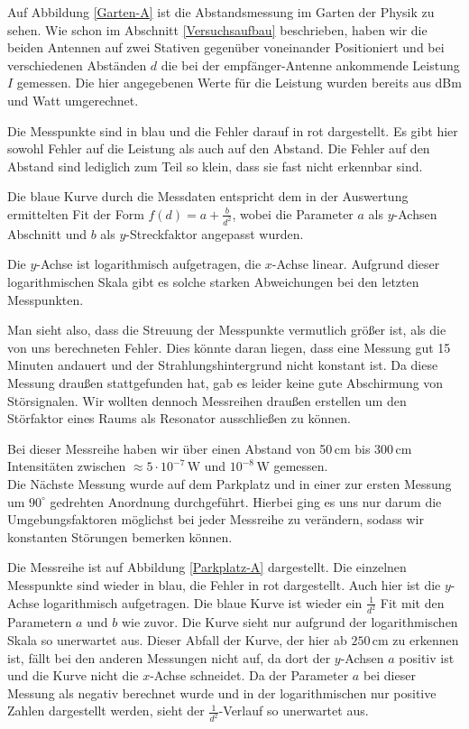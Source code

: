 \documentclass[titlepage,11pt,a4paper,ngerman]{article}
\newcommand{\tx}[1]{\textrm{#1}}
\begin{document}
Auf Abbildung \ref{Garten-A} ist die Abstandsmessung im Garten der Physik zu sehen. Wie schon im Abschnitt \ref{Versuchsaufbau} beschrieben, haben wir die beiden Antennen auf zwei Stativen gegenüber voneinander Positioniert und bei verschiedenen Abständen $ d $ die bei der empfänger-Antenne ankommende Leistung $ I $ gemessen. Die hier angegebenen Werte für die Leistung wurden bereits aus dBm und Watt umgerechnet.\par
Die Messpunkte sind in blau und die Fehler darauf in rot dargestellt. Es gibt hier sowohl Fehler auf die Leistung als auch auf den Abstand. Die Fehler auf den Abstand sind lediglich zum Teil so klein, dass sie fast nicht erkennbar sind.\par
Die blaue Kurve durch die Messdaten entspricht dem in der Auswertung ermittelten Fit der Form $ f(d) = a + \frac{b}{d^2} $, wobei die Parameter $ a $ als $ y $-Achsen Abschnitt und $ b $ als $ y $-Streckfaktor angepasst wurden.\par
Die $ y $-Achse ist logarithmisch aufgetragen, die $ x $-Achse linear. Aufgrund dieser logarithmischen Skala gibt es solche starken Abweichungen bei den letzten Messpunkten.\par
Man sieht also, dass die Streuung der Messpunkte vermutlich größer ist, als die von uns berechneten Fehler. Dies könnte daran liegen, dass eine Messung gut 15 Minuten andauert und der Strahlungshintergrund nicht konstant ist. Da diese Messung draußen stattgefunden hat, gab es leider keine gute Abschirmung von Störsignalen. Wir wollten dennoch Messreihen draußen erstellen um den Störfaktor eines Raums als Resonator ausschließen zu können.\par
Bei dieser Messreihe haben wir über einen Abstand von 50\,cm bis 300\,cm Intensitäten zwischen $ \approx 5 \cdot 10^{-7} \, \tx{W} $ und $ 10^{-8} \, \tx{W} $ gemessen.\\[10pt]
\noindent
Die Nächste Messung wurde auf dem Parkplatz und in einer zur ersten Messung um $ 90^\circ $ gedrehten Anordnung durchgeführt. Hierbei ging es uns nur darum die Umgebungsfaktoren möglichst bei jeder Messreihe zu verändern, sodass wir konstanten Störungen bemerken können.\par
Die Messreihe ist auf Abbildung \ref{Parkplatz-A} dargestellt. Die einzelnen Messpunkte sind wieder in blau, die Fehler in rot dargestellt. Auch hier ist die $ y $-Achse logarithmisch aufgetragen. Die blaue Kurve ist wieder ein $ \frac{1}{d^2} $ Fit mit den Parametern $ a $ und $ b $ wie zuvor. Die Kurve sieht nur aufgrund der logarithmischen Skala so unerwartet aus. Dieser Abfall der Kurve, der hier ab $ 250 \, \tx{cm} $ zu erkennen ist, fällt bei den anderen Messungen nicht auf, da dort der $ y $-Achsen $ a $ positiv ist und die Kurve nicht die $ x $-Achse schneidet. Da der Parameter $ a $ bei dieser Messung als negativ berechnet wurde und in der logarithmischen nur positive Zahlen dargestellt werden, sieht der $ \frac{1}{d^2} $-Verlauf so unerwartet aus.\par
\end{document}
